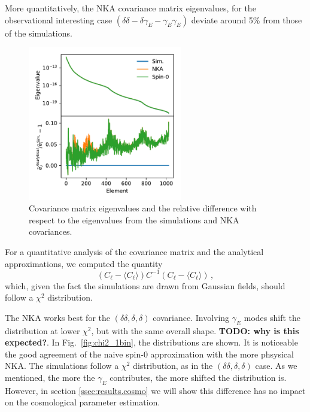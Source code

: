 \documentclass[a4paper,11pt]{article}
\newcommand{\todo}[1]{{\bf TODO: #1}}
\newcommand{\cl}{C_\ell}
\begin{document}
      More quantitatively, the NKA covariance matrix eigenvalues, for the observational interesting case $(\delta\delta-\delta\gamma_E-\gamma_E\gamma_E)$ deviate around 5\% from those of the simulations. 
      \begin{figure}[htb]
        \centering
        \includegraphics[width=0.6\textwidth]{./figures/run_sph_2b_NKA_TTTEEE_reldev_eigval_1stbin.pdf}
        \caption{Covariance matrix eigenvalues and the relative difference with respect to the eigenvalues from the simulations and NKA covariances.} \label{fig:eigv_1bin}
      \end{figure}

      For a quantitative analysis of the covariance matrix and the analytical approximations, we computed the quantity 
      \begin{equation}
        (\cl - \langle \cl \rangle )C^{-1} (\cl - \langle \cl \rangle)\,, \label{eq:chi2-def}
      \end{equation}
      which, given the fact the simulations are drawn from Gaussian fields, should follow a $\chi^2$ distribution.

      The NKA works best for the $(\delta \delta, \delta, \delta)$ covariance. Involving $\gamma_E$ modes shift the distribution at lower $\chi^2$, but with the same overall shape. \todo{why is this expected?}. In Fig.~\ref{fig:chi2_1bin}, the distributions are shown. It is noticeable the good agreement of the naive spin-0 approximation with the more phsysical NKA. The simulations follow a $\chi^2$ distribution, as in the $(\delta \delta, \delta, \delta)$ case. As we mentioned, the more the $\gamma_E$ contributes, the more shifted the distribution is. However, in section \ref{ssec:results.cosmo} we will show this difference has no impact on the cosmological parameter estimation.
\end{document}

